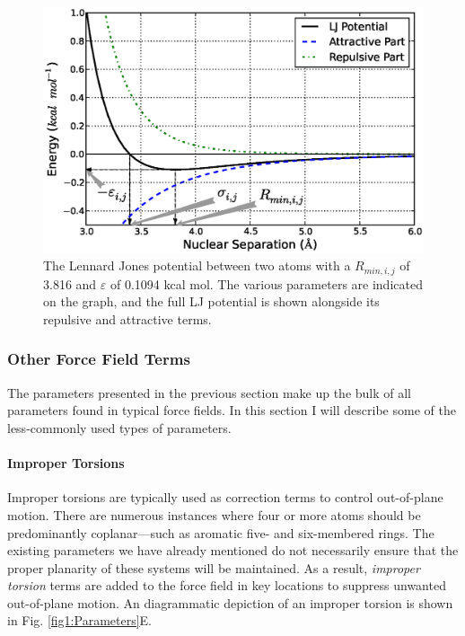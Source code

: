 \begin{figure}
   \includegraphics[width=6.5in]{LennardJones.ps}
   \caption{The Lennard Jones potential between two atoms with a $R_{min,i,j}$
            of 3.816 \text{\AA} and $\varepsilon$ of 0.1094 kcal mol.
            The various parameters are indicated on the graph, and the full LJ
            potential is shown alongside its repulsive and attractive terms.}
   \label{fig1:LennardJones}
\end{figure}

\subsubsection{Other Force Field Terms}

The parameters presented in the previous section make up the bulk of all
parameters found in typical force fields. In this section I will describe some
of the less-commonly used types of parameters.

\paragraph{Improper Torsions}

Improper torsions are typically used as correction terms to control out-of-plane
motion. There are numerous instances where four or more atoms should be
predominantly coplanar---such as aromatic five- and six-membered rings. The
existing parameters we have already mentioned do not necessarily ensure that the
proper planarity of these systems will be maintained. As a result,
\emph{improper torsion} terms are added to the force field in key locations to
suppress unwanted out-of-plane motion. An diagrammatic depiction of an improper
torsion is shown in Fig. \ref{fig1:Parameters}E.


